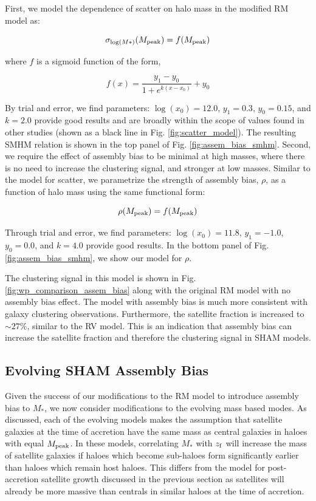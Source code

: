 \documentclass[a4paper,fleqn,usenatbib]{mnras}
\begin{document}
First, we model the dependence of scatter on halo mass in the modified RM model as:
%
\begin{linenomath}
\begin{equation}
\sigma_{\log(M*)}(M_{\rm peak}) = f(M_{\rm peak})
\end{equation}
\end{linenomath}
%
where $f$ is a sigmoid function of the form,
%
\begin{linenomath}
\begin{equation}
f(x) = \frac{y_1 - y_0}{1+ e^{k(x-x_0)}} + y_0
\end{equation}
\end{linenomath}
%
By trial and error, we find parameters: $\log(x_{0})=12.0$, $y_1=0.3$, $y_0=0.15$, and $k=2.0$ provide good results and are broadly within the scope of values found in other studies (shown as a black line in Fig. \ref{fig:scatter_model}).  The resulting SMHM relation is shown in the top panel of Fig. \ref{fig:assem_bias_smhm}.  Second, we require the effect of assembly bias to be minimal at high masses, where there is no need to increase the clustering signal, and stronger at low masses.  Similar to the model for scatter, we parametrize the strength of assembly bias, $\rho$, as a function of halo mass using the same functional form:
%
\begin{linenomath}
\begin{equation}
\rho(M_{\rm peak}) = f(M_{\rm peak})
\end{equation}
\end{linenomath}
%
Through trial and error, we find parameters: $\log(x_{0})=11.8$, $y_1=-1.0$, $y_0=0.0$, and $k=4.0$ provide good results.  In the bottom panel of Fig. \ref{fig:assem_bias_smhm}, we show our model for $\rho$.

The clustering signal in this model is shown in Fig. \ref{fig:wp_comparison_assem_bias} along with the original RM model with no assembly bias effect.  The model with assembly bias is much more consistent with galaxy clustering observations.  Furthermore, the satellite fraction is increased to $\sim 27\%$, similar to the RV model.  This is an indication that assembly bias can increase the satellite fraction and therefore the clustering signal in SHAM models. 

\subsection{Evolving SHAM Assembly Bias}

Given the success of our modifications to the RM model to introduce assembly bias to $M_*$, we now consider modifications to the evolving mass based modes.  As discussed, each of the evolving models makes the assumption that satellite galaxies at the time of accretion have the same mass as central galaxies in haloes with equal $M_{\rm peak}$.  In these models, correlating $M_*$ with $z_{\rm f}$ will increase the mass of satellite galaxies if haloes which become sub-haloes form significantly earlier than haloes which remain host haloes.  This differs from the model for post-accretion satellite growth discussed in the previous section as satellites will already be more massive than centrals in similar haloes at the time of accretion.     
\end{document}
